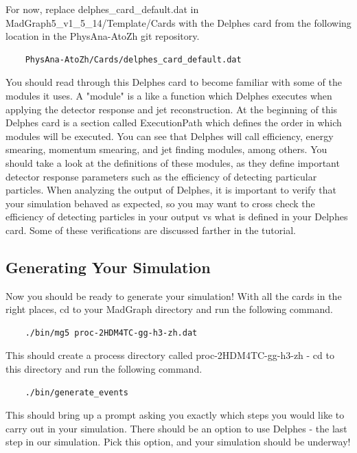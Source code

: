 \documentclass{article}
\begin{document}
\bigskip

For now, replace delphes\_card\_default.dat in MadGraph5\_v1\_5\_14/Template/Cards with the Delphes card from the following location
in the PhysAna-AtoZh git repository.

\begin{verbatim}
	PhysAna-AtoZh/Cards/delphes_card_default.dat
\end{verbatim}

You should read through this Delphes card to become familiar with some of the modules it uses. A "module" is a like a function which Delphes executes
when applying the detector response and jet reconstruction. At the beginning of this Delphes card is a section called ExecutionPath which defines
the order in which modules will be executed. You can see that Delphes will call efficiency, energy smearing, momentum smearing, and jet finding modules,
among others. You should take a look at the definitions of these modules, as they define important detector response parameters such as the efficiency
of detecting particular particles. When analyzing the output of Delphes, it is important to verify that your simulation behaved as expected, so you may
want to cross check the efficiency of detecting particles in your output vs what is defined in your Delphes card. Some of these verifications are discussed
farther in the tutorial.

\subsection{Generating Your Simulation}

Now you should be ready to generate your simulation! With all the cards in the right places, cd to your MadGraph directory and run the following command.

\begin{verbatim}
	./bin/mg5 proc-2HDM4TC-gg-h3-zh.dat
\end{verbatim}

This should create a process directory called proc-2HDM4TC-gg-h3-zh - cd to this directory and run the following command.

\begin{verbatim}
	./bin/generate_events
\end{verbatim}

This should bring up a prompt asking you exactly which steps you would like to carry out in
your simulation. There should be an option to use Delphes - the last step in our simulation.
Pick this option, and your simulation should be underway!
\end{document}
